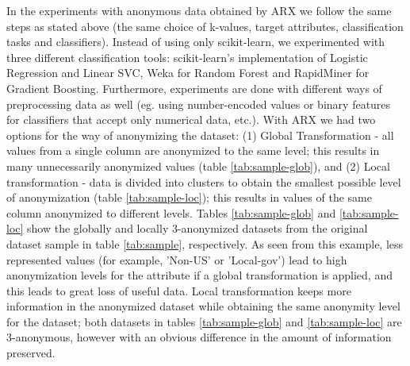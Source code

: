 \documentclass{article}
\begin{document}
In the experiments with anonymous data obtained by ARX we follow the same steps as stated above (the same choice of k-values, target attributes, classification tasks and classifiers). Instead of using only scikit-learn, we experimented with three different classification tools: scikit-learn's implementation of Logistic Regression and Linear SVC, Weka for Random Forest and RapidMiner for Gradient Boosting. Furthermore, experiments are done with different ways of preprocessing data as well (eg. using number-encoded values or binary features for classifiers that accept only numerical data, etc.). With ARX we had two options for the way of anonymizing the dataset: (1) Global Transformation - all values from a single column are anonymized to the same level; this results in many unnecessarily anonymized values (table \ref{tab:sample-glob}), and (2) Local transformation - data is divided into clusters to obtain the smallest possible level of anonymization (table \ref{tab:sample-loc}); this results in values of the same column anonymized to different levels. Tables \ref{tab:sample-glob} and \ref{tab:sample-loc} show the globally and locally 3-anonymized datasets from the original dataset sample in table \ref{tab:sample}, respectively. As seen from this example, less represented values (for example, 'Non-US' or 'Local-gov') lead to high anonymization levels for the attribute if a global transformation is applied, and this leads to great loss of useful data. Local transformation keeps more information in the anonymized dataset while obtaining the same anonymity level for the dataset; both datasets in tables \ref{tab:sample-glob} and \ref{tab:sample-loc} are 3-anonymous, however with an obvious difference in the amount of information preserved.
\end{document}

